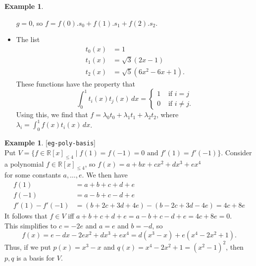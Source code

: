 \documentclass{amsart}
\newcommand{\lbl}[1]{\label{#1}\textup{[\texttt{#1}]}\ \\}
\newcommand{\lbl}{\label}
\newcommand{\R}         {{\mathbb{R}}}
\newcommand{\lm}        {\lambda}
\newcommand{\st}        {\;|\;}
\renewcommand{\:}       {\colon}
\theoremstyle{definition}
\newtheorem{example}[theorem]{Example}
\begin{document}
\begin{example}
\begin{itemize}
    $g=0$, so $f=f(0).s_0+f(1).s_1+f(2).s_2$.
  \item The list
    \begin{align*}
      t_0(x) &= 1 \\
      t_1(x) &= \sqrt{3}(2x-1) \\
      t_2(x) &= \sqrt{5}(6x^2-6x+1).
    \end{align*}
    These functions have the property that 
    \[ \int_0^1 t_i(x)t_j(x)\, dx = 
        \begin{cases}
         1 & \text{ if } i=j \\
         0 & \text{ if } i\neq j.
        \end{cases}
    \]
    Using this, we find that $f=\lm_0t_0+\lm_1t_1+\lm_2t_2$,
    where $\lm_i=\int_0^1 f(x)t_i(x)\,dx$.
 \end{itemize}
\end{example}

\begin{example}\lbl{eg-poly-basis}
 Put
 $V=\{f\in\R[x]_{\leq 4}\st f(1)=f(-1)=0 \text{ and } f'(1)=f'(-1)\}$.
 {Consider a polynomial $f\in\R[x]_{\leq 4}$, so
 $f(x)=a+bx+cx^2+dx^3+ex^4$\\ 
 for some constants $a,\dotsc,e$.}{  We then have
 \begin{align*}
  f(1)  &= a+b+c+d+e \\
  f(-1) &= a-b+c-d+e \\
  f'(1)-f'(-1) &= (b+2c+3d+4e)-(b-2c+3d-4e) 
                = 4c+8e 
 \end{align*}}
 {It follows that $f\in V$ iff
 $a+b+c+d+e=a-b+c-d+e=4c+8e=0$.}{ \\
 This simplifies to $c=-2e$ and $a=e$ and $b=-d$}{, so
 \[ f(x)=e-dx-2ex^2+dx^3+ex^4=d(x^3-x)+e(x^4-2x^2+1). \]}
 {Thus, if we put $p(x)=x^3-x$ and $q(x)=x^4-2x^2+1=(x^2-1)^2$,
 then $p,q$ is a basis for $V$.}
\end{example}
\end{document}
